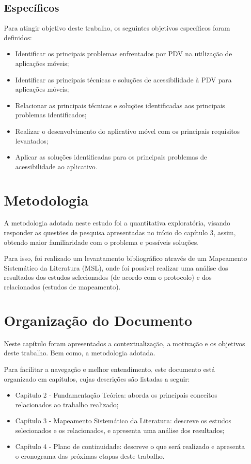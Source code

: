 \subsection{Específicos}

Para atingir objetivo deste trabalho, os seguintes objetivos específicos foram definidos:

\begin{itemize}
    \item Identificar os principais problemas enfrentados por PDV na utilização de aplicações móveis;
    \item Identificar as principais técnicas e soluções de acessibilidade à PDV para aplicações móveis;
    \item Relacionar as principais técnicas e soluções identificadas aos principais problemas identificados;
    \item Realizar o desenvolvimento do aplicativo móvel com os principais requisitos levantados;
    \item Aplicar as soluções identificadas para os principais problemas de acessibilidade ao aplicativo.
\end{itemize}

\section{Metodologia}

A metodologia adotada neste estudo foi a quantitativa exploratória, visando responder as questões de pesquisa apresentadas
no início do capítulo 3, assim, obtendo maior familiaridade com o problema e possíveis soluções.

Para isso, foi realizado um levantamento bibliográfico através de um Mapeamento Sistemático da Literatura (MSL), onde foi possível
realizar uma análise dos resultados dos estudos selecionados (de acordo com o protocolo) e dos relacionados (estudos de mapeamento).

\section{Organização do Documento}
Neste capítulo foram apresentados a contextualização, a motivação e os objetivos deste trabalho. Bem como, a metodologia adotada.

Para facilitar a navegação e melhor entendimento, este documento está organizado em capítulos, cujas descrições são listadas a seguir:
\begin{itemize}
    \item Capítulo 2 - Fundamentação Teórica: aborda os principais conceitos relacionados ao trabalho realizado;
    \item Capítulo 3 - Mapeamento Sistemático da Literatura: descreve os estudos selecionados e os relacionados, e apresenta uma análise dos resultados;
    \item Capítulo 4 - Plano de continuidade: descreve o que será realizado e apresenta o cronograma das próximas etapas deste trabalho.
\end{itemize}
